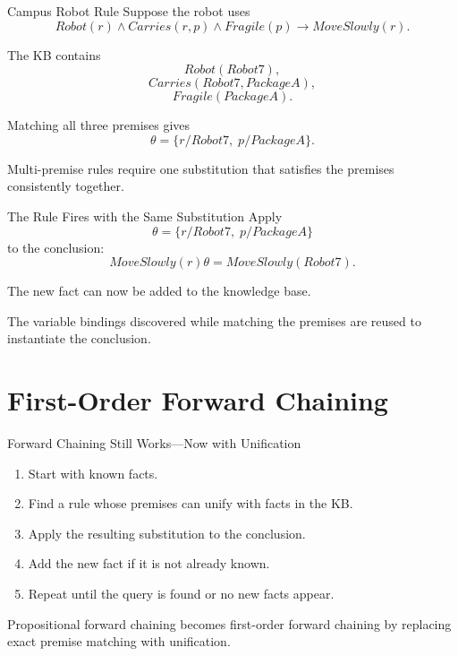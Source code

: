\documentclass[aspectratio=169,10pt]{beamer}
\begin{document}
\begin{frame}[shrink=10]{Campus Robot Rule}
  Suppose the robot uses
  \[
    Robot(r) \land Carries(r,p) \land Fragile(p)
    \rightarrow MoveSlowly(r).
  \]

  The KB contains
  \[
    Robot(Robot7),
  \]
  \[
    Carries(Robot7,PackageA),
  \]
  \[
    Fragile(PackageA).
  \]

  Matching all three premises gives
  \[
    \theta=\{r/Robot7,\;p/PackageA\}.
  \]

  \begin{keyidea}
    Multi-premise rules require one substitution that satisfies the premises consistently together.
  \end{keyidea}
\end{frame}

\begin{frame}[shrink=10]{The Rule Fires with the Same Substitution}
  Apply
  \[
    \theta=\{r/Robot7,\;p/PackageA\}
  \]
  to the conclusion:
  \[
    MoveSlowly(r)\theta
    = MoveSlowly(Robot7).
  \]

  The new fact can now be added to the knowledge base.

  \begin{keyidea}
    The variable bindings discovered while matching the premises are reused to instantiate the conclusion.
  \end{keyidea}
\end{frame}

\section{First-Order Forward Chaining}

\begin{frame}[shrink=10]{Forward Chaining Still Works---Now with Unification}
  \begin{enumerate}
    \item Start with known facts.
    \item Find a rule whose premises can unify with facts in the KB.
    \item Apply the resulting substitution to the conclusion.
    \item Add the new fact if it is not already known.
    \item Repeat until the query is found or no new facts appear.
  \end{enumerate}

  \begin{keyidea}
    Propositional forward chaining becomes first-order forward chaining by replacing exact premise matching with unification.
  \end{keyidea}
\end{frame}
\end{document}
